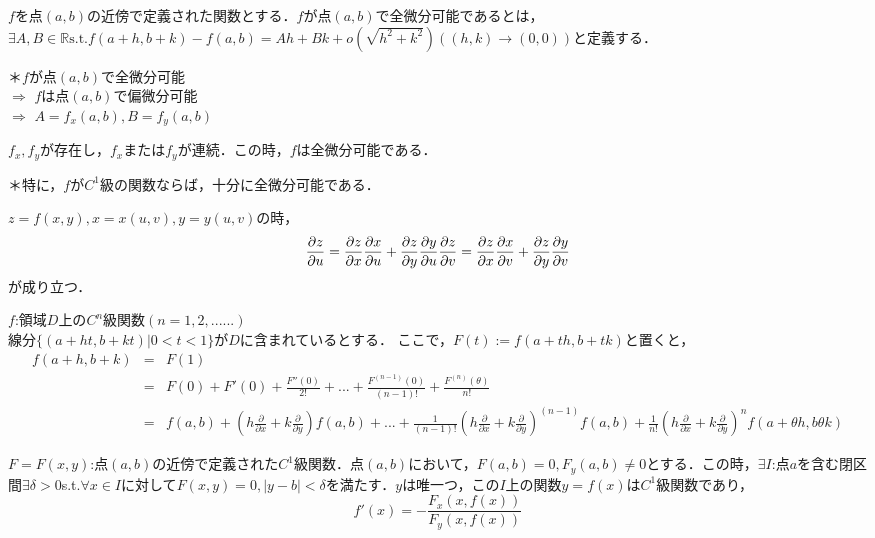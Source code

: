 \documentclass[uplatex, dvipdfmx]{jsreport}
\begin{document}
\begin{definition}[全微分可能性]$f$を点$(a,b)$の近傍で定義された関数とする．$f$が点$(a,b)$で全微分可能であるとは，$\exists A,B \in \mathbb{R} \mathrm{s.t.} f(a+h,b+k)-f(a,b)=Ah+Bk+o(\sqrt{h^2+k^2})  \left( (h,k)\to(0,0) \right)$と定義する．\end{definition}
\noindent
＊$f$が点$(a,b)$で全微分可能\\ $\Longrightarrow$ $f$は点$(a,b)$で偏微分可能\\ $\Longrightarrow$ $A=f_x(a,b), B=f_y(a,b)$

\begin{theorem}$f_x,f_y$が存在し，$f_x$または$f_y$が連続．この時，$f$は全微分可能である．
\end{theorem}
\noindent
＊特に，$f$が$C^1$級の関数ならば，十分に全微分可能である．

\begin{theorem}$z=f(x,y), x=x(u,v), y=y(u,v)$の時，$$\frac{\partial z}{\partial u} = \frac{\partial z}{\partial x} \frac{\partial x}{\partial u} + \frac{\partial z}{\partial y} \frac{\partial y}{\partial u} \\  \frac{\partial z}{\partial v} = \frac{\partial z}{\partial x} \frac{\partial x}{\partial v} + \frac{\partial z}{\partial y} \frac{\partial y}{\partial v}$$が成り立つ．\end{theorem}

\begin{theorem}[Taylorの定理]$f$:領域$D$上の$C^n$級関数$(n=1,2,......)$\\線分$\{ (a+ht,b+kt) | 0<t<1 \}$が$D$に含まれているとする．
ここで，$F(t):=f(a+th,b+tk)$と置くと，\begin{eqnarray*} f(a+h,b+k)&=&F(1) \\ &=&F(0)+F'(0)+\frac{F''(0)}{2!}+...+\frac{F^{(n-1)}(0)}{(n-1)!}+\frac{F^{(n)}(\theta)}{n!}\\&=&f(a,b)+\left( h\frac{\partial}{\partial x}+ k\frac{\partial}{\partial y} \right)f(a,b)+...+\frac{1}{(n-1)!} \left( h\frac{\partial}{\partial x}+ k\frac{\partial}{\partial y} \right)^{(n-1)} f(a,b) + \frac{1}{n!} \left( h\frac{\partial}{\partial x}+ k\frac{\partial}{\partial y} \right)^n f(a+\theta h,b\theta k)   \end{eqnarray*} \end{theorem}

\begin{theorem}[陰関数定理]$F=F(x,y)$:点$(a,b)$の近傍で定義された$C^1$級関数．点$(a,b)$において，$F(a,b)=0, F_y(a,b) \neq 0$とする．この時，$\exists I$:点$a$を含む閉区間$\exists \delta>0$s.t.$\forall x \in I$に対して$F(x,y)=0, |y-b|<\delta$を満たす．$y$は唯一つ，この$I$上の関数$y=f(x)$は$C^1$級関数であり，$$f'(x)=-\frac{F_x(x,f(x))}{F_y(x,f(x))}$$
\end{theorem}
\end{document}
